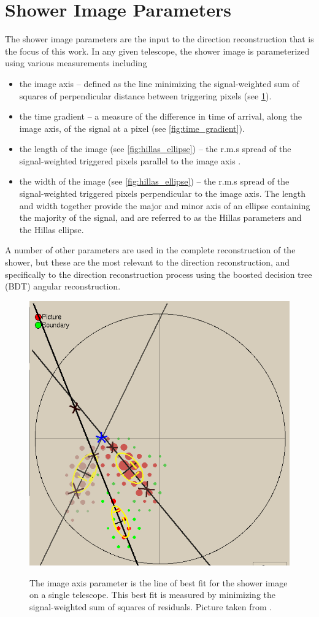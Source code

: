\documentclass[main.tex]{subfiles}
\begin{document}
\section{Shower Image Parameters}
\label{shower-img-params}
The shower image parameters are the input to the direction reconstruction that is the focus of this work. In any given telescope, the shower image is parameterized using various measurements including
\begin{itemize}
\item the image axis -- defined as the line minimizing the signal-weighted sum of squares of perpendicular distance between triggering pixels (see \ref{fig:image_axis}).
\item the time gradient -- a measure of the difference in time of arrival, along the image axis, of the signal at a pixel (see \ref{fig:time_gradient}).
\item the length of the image (see \ref{fig:hillas_ellipse}) -- the r.m.s spread of the signal-weighted triggered pixels parallel to the image axis \cite{Hillas:1985}.
\item the width of the image (see \ref{fig:hillas_ellipse}) -- the r.m.s spread of the signal-weighted triggered pixels perpendicular to the image axis. The length and width together provide the major and minor axis of an ellipse containing the majority of the signal, and are referred to as the Hillas parameters and the Hillas ellipse.
\end{itemize}
A number of other parameters are used in the complete reconstruction of the shower, but these are the most relevant to the direction reconstruction, and specifically to the direction reconstruction process using the boosted decision tree (BDT) angular reconstruction.
\begin{figure}[htbp]
  \centering
      \includegraphics[width=0.45\linewidth]{images/img_axis}
      \label{fig:image_axis}
      \caption[The image axis parameter.]{The image axis parameter is the line of best fit for the shower image on a single telescope. This best fit is measured by minimizing the signal-weighted sum of squares of residuals. Picture taken from \cite{veritas_web}.}

\end{figure}
\end{document}
